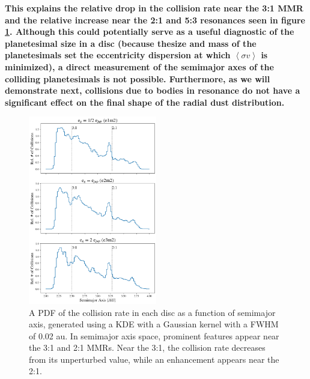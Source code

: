 \documentclass[fleqn,usenatbib]{mnras}
\begin{document}
\textbf{ This explains the relative drop in the collision rate
near the 3:1 MMR and the relative increase near the 2:1 and 5:3
resonances \textbf{seen in figure \ref{fig:coll_hist_a}}. Although this could potentially serve as a useful
diagnostic of the planetesimal size in a disc (because the\textbf{size and mass of the planetesimals set the eccentricity dispersion at which $\left< \sigma v \right>$ is minimized}), a direct measurement of the
semimajor axes of the colliding planetesimals is not
possible. Furthermore, as we will demonstrate next, collisions due to bodies in resonance do not have a significant effect on the final shape of the radial dust distribution.}

\begin{figure}
\begin{center}
    \includegraphics[width=0.5\textwidth]{figures/coll_hist_a.png}
    \caption{A PDF of the collision rate in each disc as a function of semimajor axis, generated using a KDE with a Gaussian kernel with a FWHM of 0.02 au. In semimajor axis space, prominent features appear near the 3:1 and 2:1 MMRs. Near the 3:1, the collision rate decreases from its unperturbed value, while an enhancement appears near the 2:1.\label{fig:coll_hist_a}}
\end{center}
\end{figure}
\end{document}
